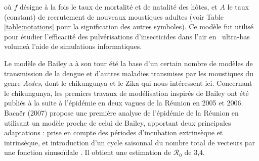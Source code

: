 où $f$ désigne à la fois le taux de mortalité et de natalité des hôtes, et $A$ le taux (constant) de recrutement de nouveaux moustiques adultes (voir Table \ref{table:notations} pour la signification des autres symboles).
Ce modèle fut utilisé pour étudier l'efficacité des pulvérisations d'insecticides dans l'air en \guillemotleft\, ultra-bas volume\guillemotright à l'aide de simulations informatiques. 

Le modèle de Bailey a à son tour été la base d'un certain nombre de modèles de transmission de la dengue et d'autres maladies transmises par les moustiques du genre {\em Aedes}, dont le chikungunya et le Zika qui nous intéressent ici.
Concernant le chikungunya, les premiers travaux de modélisation inspirés de Bailey ont été publiés à la suite à l'épidémie en deux vagues de la Réunion en 2005 et 2006.
Bacaër (2007) propose une première analyse de l'épidémie de la Réunion en utilisant un modèle proche de celui de Bailey, apportant deux principales adaptations : prise en compte des périodes d'incubation extrinsèque et intrinsèque, et introduction d'un cycle saisonnal du nombre total de vecteurs par une fonction sinusoïdale \cite{bacaer2007approximation}. 
Il obtient une estimation de $\mathcal{R}_0$ de 3,4.
